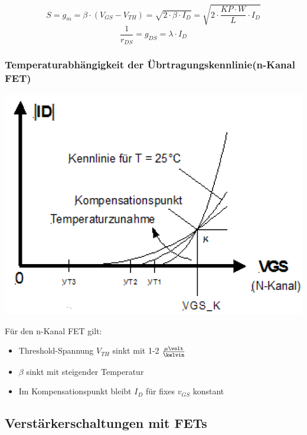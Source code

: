     $$ S = g_m = \beta \cdot (V_{GS} - V_{TH}) = \sqrt{2 \cdot \beta \cdot I_D} = \sqrt{ 2 \cdot \frac{KP \cdot W}{L} \cdot I_D} $$
    $$ \frac{1}{r_{DS}} = g_{DS} = \lambda \cdot I_D $$


\subsubsection{Temperaturabhängigkeit der Übrtragungskennlinie(n-Kanal FET)}

    \begin{minipage}[c]{0.4\columnwidth}
        \includegraphics[width= \columnwidth]{images/mos_fet_eingangskennlinie_temperatur.png}
    \end{minipage}
    \hfill
    \begin{minipage}[c]{0.58\columnwidth}
        Für den n-Kanal FET gilt:
        \begin{itemize}
            \item Threshold-Spannung $V_{TH}$ sinkt mit 1-2 $\frac{\mathrm{\mu} \volt}{\kelvin}$
            \item $\beta$ sinkt mit steigender Temperatur
            \item Im Kompensationspunkt bleibt $I_D$ für fixes $v_{GS}$ konstant
        \end{itemize}
    \end{minipage}

    
\subsection{Verstärkerschaltungen mit FETs}

